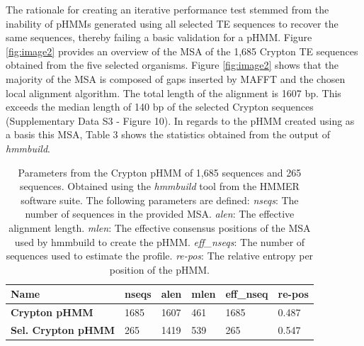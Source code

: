 \documentclass[unnumsec,webpdf,contemporary,large]{oup-authoring-template}%
\theoremstyle{thmstyleone}%
\theoremstyle{thmstyletwo}%
\theoremstyle{thmstylethree}%
\begin{document}
The rationale for creating an iterative performance test stemmed from the inability of pHMMs generated using all selected TE sequences to recover the same sequences, thereby failing a basic validation for a pHMM. Figure \ref{fig:image2} provides an overview of the MSA of the 1,685 Crypton TE sequences obtained from the five selected organisms. Figure \ref{fig:image2} shows that the majority of the MSA is composed of gaps inserted by MAFFT and the chosen local alignment algorithm. The total length of the alignment is 1607 bp. This exceeds the median length of 140 bp of the selected Crypton sequences (Supplementary Data S3 - Figure 10). In regards to the pHMM created using as a basis this MSA, Table 3 shows the statistics obtained from the output of \textit{hmmbuild}. 

\begin{table}[!t]
\caption{Parameters from the Crypton pHMM of 1,685 sequences and 265 sequences. Obtained using the \textit{hmmbuild} tool from the HMMER software suite. The following parameters are defined: \textit{nseqs}: The number of sequences in the provided MSA. \textit{alen}: The effective alignment length. \textit{mlen}: The effective consensus positions of the MSA used by hmmbuild to create the pHMM. \textit{eff\_nseqs}: The number of sequences used to estimate the profile. \textit{re-pos}: The relative entropy per position of the pHMM.} \label{table:tab3}
\begin{tabularx}{\columnwidth}{@{} X l l l l l @{}}
\toprule
\textbf{Name} & \textbf{nseqs} & \textbf{alen} & \textbf{mlen} & \textbf{eff\_nseq} & \textbf{re-pos}\\
\midrule
\textbf{Crypton pHMM} & 1685 & 1607 & 461 & 1685 & 0.487 \\
\textbf{Sel. Crypton pHMM} & 265 & 1419 & 539 & 265 & 0.547 \\
\bottomrule
\end{tabularx}
\end{table}
\raggedbottom
\end{document}

